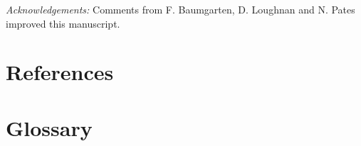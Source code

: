 \documentclass[11pt]{article}
\begin{document}
\emph{Acknowledgements:} Comments from F. Baumgarten, D. Loughnan and N. Pates improved this manuscript. 

\newpage
\section{References}
\vspace{-5ex}


\clearpage

\section{Glossary}

\end{document}
